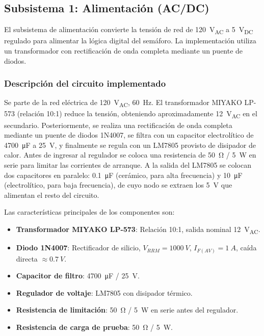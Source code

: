 \documentclass[10pt,onecolumn]{IEEEtran}
\begin{document}
\subsection{Subsistema 1: Alimentación (AC/DC)}
\label{subsec:fuente}

El subsistema de alimentación convierte la tensión de red de \SI{120}{\volt_{AC}} a \SI{5}{\volt_{DC}} regulado para alimentar la lógica digital del semáforo. La implementación utiliza un transformador con rectificación de onda completa mediante un puente de diodos.

\subsubsection{Descripción del circuito implementado}

Se parte de la red eléctrica de \SI{120}{\volt_{AC}}, \SI{60}{\hertz}. El transformador MIYAKO LP-573 (relación 10:1) reduce la tensión, obteniendo aproximadamente \SI{12}{\volt_{AC}} en el secundario. Posteriormente, se realiza una rectificación de onda completa mediante un puente de diodos 1N4007, se filtra con un capacitor electrolítico de \SI{4700}{\micro\farad} a \SI{25}{\volt}, y finalmente se regula con un LM7805 provisto de disipador de calor. Antes de ingresar al regulador se coloca una resistencia de \SI{50}{\ohm} / \SI{5}{\watt} en serie para limitar las corrientes de arranque. A la salida del LM7805 se colocan dos capacitores en paralelo: \SI{0.1}{\micro\farad} (cerámico, para alta frecuencia) y \SI{10}{\micro\farad} (electrolítico, para baja frecuencia), de cuyo nodo se extraen los \SI{+5}{\volt} que alimentan el resto del circuito.

Las características principales de los componentes son:
\begin{itemize}
    \item \textbf{Transformador MIYAKO LP-573}: Relación 10:1, salida nominal \SI{12}{V_{AC}}.
    \item \textbf{Diodo 1N4007}: Rectificador de silicio, $V_{RRM}=\SI{1000}{V}$, $I_{F(AV)}=\SI{1}{A}$, caída directa $\approx \SI{0.7}{V}$.
    \item \textbf{Capacitor de filtro}: \SI{4700}{\micro\farad} / \SI{25}{V}.
    \item \textbf{Regulador de voltaje}: LM7805 con disipador térmico.
    \item \textbf{Resistencia de limitación}: \SI{50}{\ohm} / \SI{5}{W} en serie antes del regulador.
    \item \textbf{Resistencia de carga de prueba}: \SI{50}{\ohm} / \SI{5}{W}.
\end{itemize}
\end{document}
